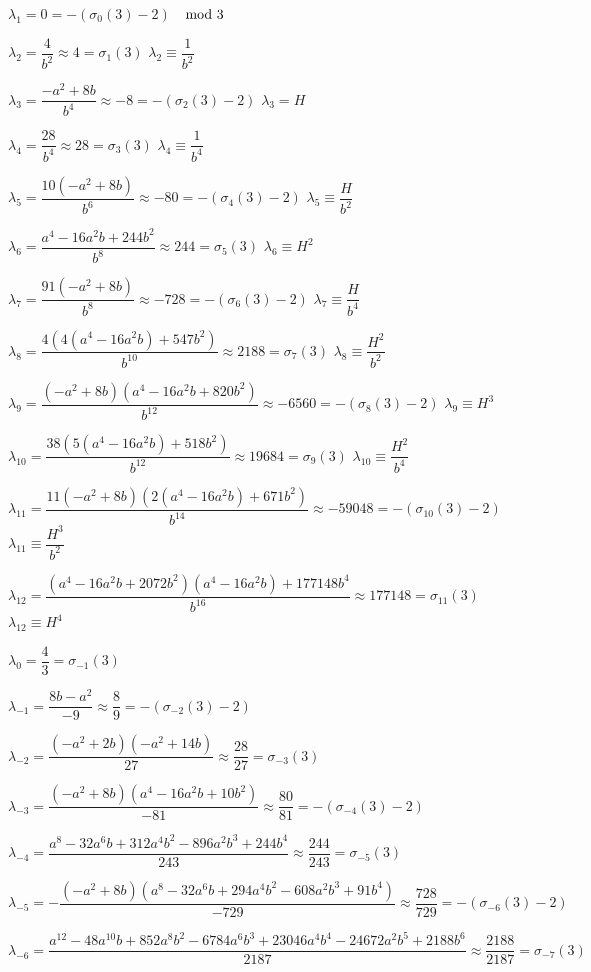 \documentclass{rs}
\theoremstyle{definition}
\theoremstyle{remark}
\newcommand{\md}{~~{\rm mod}~}
\renewcommand{\l}{\lambda}
\newcommand{\si}{\sigma}
\renewcommand{\=}{\approx}
\renewcommand{\-}{\sim}
\numberwithin{equation}{section}
\numberwithin{thm}{section}
\begin{document}
\begin{itemize}
 $\l_1 = 0 = -(\si_0(3) - 2)$ \hfill $\md 3$

 $\l_2 = \dfrac{4}{b^2} \= 4 = \si_1(3)$ \hfill $\l_2 \equiv \dfrac{1}{b^2}$ 

 $\l_3 = \dfrac{-a^2 + 8 b}{b^4} \= -8 = -(\si_2(3) - 2)$ \hfill $\l_3 = H$ 

 $\l_4 = \dfrac{28}{b^4} \= 28 = \si_3(3)$ \hfill $\l_4 \equiv \dfrac{1}{b^4}$ 

 $\l_5 = \dfrac{10 (-a^2 + 8 b)}{b^6} \= -80 = -(\si_4(3) - 2)$ \hfill $\l_5 \equiv \dfrac{H}{b^2}$ 

 $\l_6 = \dfrac{a^4 -16 a^2 b + 244 b^2}{b^8} \= 244 = \si_5(3)$ \hfill $\l_6 \equiv H^2$ 

 $\l_7 = \dfrac{91 (-a^2 + 8 b)}{b^8} \= -728 = -(\si_6(3) - 2)$ \hfill $\l_7 \equiv \dfrac{H}{b^4}$ 

 $\l_8 = \dfrac{4 (4 (a^4 - 16 a^2 b) + 547 b^2)}{b^{10}} \= 2188 = \si_7(3)$ \hfill $\l_8 \equiv \dfrac{H^2}{b^2}$ 

 $\l_9 = \dfrac{(-a^2 + 8 b) (a^4 - 16 a^2 b + 820 b^2)}{b^{12}} \= -6560 = -(\si_8(3) - 2)$ \hfill $\l_9 \equiv H^3$ 

 $\l_{10} = \dfrac{38 (5 (a^4 - 16 a^2 b) + 518 b^2)}{b^{12}} \= 19684 = \si_9(3)$ \hfill $\l_{10} \equiv \dfrac{H^2}{b^4}$ 

 $\l_{11} = \dfrac{11 (-a^2 + 8 b) (2 (a^4 - 16 a^2 b) + 671 b^2)}{b^{14}} \= -59048 = -(\si_{10}(3) - 2)$ \hfill $\l_{11} \equiv \dfrac{H^3}{b^2}$ 

 $\l_{12} = \dfrac{(a^4 - 16 a^2 b + 2072 b^2) (a^4 - 16 a^2 b) + 177148 b^4}{b^{16}} \= 177148 = \si_{11}(3)$ \hfill $\l_{12} \equiv H^4$ 

 $\l_0 = \dfrac{4}{3} = \si_{-1}(3)$ 

 $\l_{-1} = \dfrac{8 b - a^2}{-9} \= \dfrac{8}{9} = -(\si_{-2}(3) - 2)$ 

 $\l_{-2} = \dfrac{(-a^2 + 2 b) (-a^2 + 14 b)}{27} \= \dfrac{28}{27} = \si_{-3}(3)$ 

 $\l_{-3} = \dfrac{(-a^2 + 8 b) (a^4 - 16 a^2 b + 10 b^2)}{-81} \= \dfrac{80}{81} = -(\si_{-4}(3) - 2)$ 

 $\l_{-4} = \dfrac{a^8 - 32 a^6 b + 312 a^4 b^2 - 896 a^2 b^3 + 244 b^4}{243} \= \dfrac{244}{243} = \si_{-5}(3)$ 

 $\l_{-5} = -\dfrac{(-a^2 + 8 b) (a^8 - 32 a^6 b + 294 a^4 b^2 - 608 a^2 b^3 + 91 b^4)}{-729} \= \dfrac{728}{729} = -(\si_{-6}(3) - 2)$ 

 $\l_{-6} = \dfrac{a^{12} - 48 a^{10} b + 852 a^8 b^2 - 6784 a^6 b^3 + 23046 a^4 b^4 - 24672 a^2 b^5 + 2188 b^6}{2187} \= \dfrac{2188}{2187} = \si_{-7}(3)$ 


\end{itemize}
\end{document}
